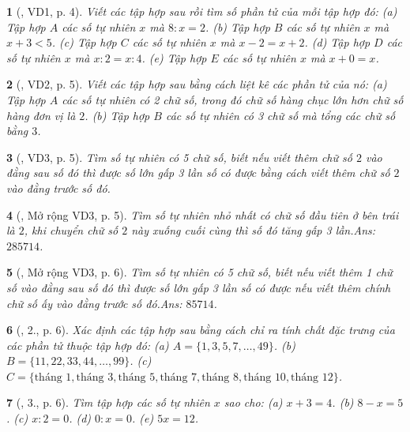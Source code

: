 \documentclass{article}
\newtheorem{baitoan}{}
\begin{document}
\begin{baitoan}[\cite{Binh_Toan_6_tap_1}, VD1, p. 4]
	Viết các tập hợp sau rồi tìm số phần tử của mỗi tập hợp đó: (a) Tập hợp $A$ các số tự nhiên $x$ mà $8:x = 2$. (b) Tập hợp $B$ các số tự nhiên $x$ mà $x + 3 < 5$. (c) Tập hợp $C$ các số tự nhiên $x$ mà $x - 2 = x + 2$. (d) Tập hợp $D$ các số tự nhiên $x$ mà $x:2 = x:4$. (e) Tập hợp $E$ các số tự nhiên $x$ mà $x + 0 = x$.
\end{baitoan}

\begin{baitoan}[\cite{Binh_Toan_6_tap_1}, VD2, p. 5]
	Viết các tập hợp sau bằng cách liệt kê các phần tử của nó: (a) Tập hợp $A$ các số tự nhiên có 2 chữ số, trong đó chữ số hàng chục lớn hơn chữ số hàng đơn vị là $2$. (b) Tập hợp $B$ các số tự nhiên có 3 chữ số mà tổng các chữ số bằng $3$.
\end{baitoan}

\begin{baitoan}[\cite{Binh_Toan_6_tap_1}, VD3, p. 5]
	Tìm số tự nhiên có 5 chữ số, biết nếu viết thêm chữ số $2$ vào đằng sau số đó thì được số lớn gấp 3 lần số có được bằng cách viết thêm chữ số $2$ vào đằng trước số đó.
\end{baitoan}

\begin{baitoan}[\cite{Binh_Toan_6_tap_1}, Mở rộng VD3, p. 5]
	Tìm số tự nhiên nhỏ nhất có chữ số đầu tiên ở bên trái là $2$, khi chuyển chữ số $2$ này xuống cuối cùng thì số đó tăng gấp 3 lần.\hfill{\sf Ans:} $285714$.
\end{baitoan}

\begin{baitoan}[\cite{Binh_Toan_6_tap_1}, Mở rộng VD3, p. 6]
	Tìm số tự nhiên có 5 chữ số, biết nếu viết thêm 1 chữ số vào đằng sau số đó thì được số lớn gấp 3 lần số có được nếu viết thêm chính chữ số ấy vào đằng trước số đó.\hfill{\sf Ans:} $85714$.
\end{baitoan}

\begin{baitoan}[\cite{Binh_Toan_6_tap_1}, 2., p. 6]
	Xác định các tập hợp sau bằng cách chỉ ra tính chất đặc trưng của các phần tử thuộc tập hợp đó: (a) $A = \{1,3,5,7,\ldots,49\}$. (b) $B = \{11,22,33,44,\ldots,99\}$. (c) $C = \{\mbox{tháng } 1,\mbox{tháng } 3,\mbox{tháng } 5,\mbox{tháng } 7,\mbox{tháng } 8,\mbox{tháng } 10,\mbox{tháng } 12\}$.
\end{baitoan}

\begin{baitoan}[\cite{Binh_Toan_6_tap_1}, 3., p. 6]
	Tìm tập hợp các số tự nhiên $x$ sao cho: (a) $x + 3 = 4$. (b) $8 - x = 5$. (c) $x:2 = 0$. (d) $0:x = 0$. (e) $5x = 12$.
\end{baitoan}
\end{document}
